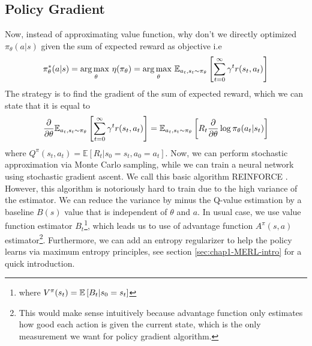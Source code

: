 \subsection{Policy Gradient \cite{sutton2000policy}}
Now, instead of approximating value function, why don't we directly optimized $\pi_\theta(a | s)$ given the sum of expected reward as objective i.e 
\begin{equation}
    \pi_\theta^*(a | s) = \underset{\theta}{\arg\max \ } \eta(\pi_\theta) = \underset{\theta}{\arg\max \ }\mathbb{E}_{a_t, s_t \sim \pi_\theta}\left[ \sum^\infty_{t=0}\gamma^t r(s_t, a_t) \right]
\end{equation}
The strategy is to find the gradient of the sum of expected reward, which we can state that it is equal to
\begin{equation}
    \frac{\partial}{\partial \theta} \mathbb{E}_{a_t, s_t \sim \pi_\theta}\left[ \sum^\infty_{t=0}\gamma^t r(s_t, a_t) \right] = \mathbb{E}_{a_t, s_t \sim \pi_\theta}\left[ R_t\frac{\partial}{\partial \theta} \log \pi_\theta(a_t | s_t)  \right]
\end{equation}
where $Q^\pi(s_t, a_t) = \mathbb{E}\left[R_t | s_0 = s_t, a_0 = a_t\right]$. Now, we can perform stochastic approximation via Monte Carlo sampling, while we can train a neural network using stochastic gradient ascent. We call this basic algorithm REINFORCE \cite{sutton2000policy}. However, this algorithm is notoriously hard to train due to the high variance of the estimator. We can reduce the variance by minus the Q-value estimation by a baseline $B(s)$ value that is independent of $\theta$ and $a$. In usual case, we use value function estimator $B_t$\footnote{where $V^\pi(s_t) = \mathbb{E}\left[ B_t | s_0 = s_t \right]$}, which leads us to use of advantage function $A^\pi(s, a)$ estimator\footnote{This would make sense intuitively because advantage function only estimates how good each action is given the current state, which is the only measurement we want for policy gradient algorithm.}. Furthermore, we can add an entropy regularizer to help the policy learns via maximum entropy principles, see section \ref{sec:chap1-MERL-intro} for a quick introduction.

